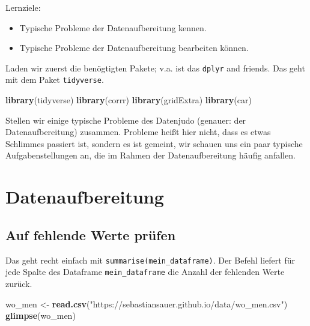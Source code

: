 \documentclass[12pt,ngerman,]{book}
\makeatletter
\newenvironment{Shaded}{\begin{snugshade}}{\end{snugshade}}
\newcommand{\KeywordTok}[1]{\textcolor[rgb]{0.13,0.29,0.53}{\textbf{{#1}}}}
\newcommand{\StringTok}[1]{\textcolor[rgb]{0.31,0.60,0.02}{{#1}}}
\newcommand{\NormalTok}[1]{{#1}}
\providecommand{\tightlist}{%
  \setlength{\itemsep}{0pt}\setlength{\parskip}{0pt}}
\newenvironment{kframe}{%
\medskip{}
\setlength{\fboxsep}{.8em}
 \def\at@end@of@kframe{}%
 \ifinner\ifhmode%
  \def\at@end@of@kframe{\end{minipage}}%
  \begin{minipage}{\columnwidth}%
 \fi\fi%
 \def\FrameCommand##1{\hskip\@totalleftmargin \hskip-\fboxsep
 \colorbox{shadecolor}{##1}\hskip-\fboxsep
     \hskip-\linewidth \hskip-\@totalleftmargin \hskip\columnwidth}%
 \MakeFramed {\advance\hsize-\width
   \@totalleftmargin\z@ \linewidth\hsize
   \@setminipage}}%
 {\par\unskip\endMakeFramed%
 \at@end@of@kframe}
\renewenvironment{Shaded}{\begin{kframe}}{\end{kframe}}
\let\BeginKnitrBlock\begin \let\EndKnitrBlock\end
\makeatother
\begin{document}
\BeginKnitrBlock{rmdcaution}
Lernziele:

\begin{itemize}
\tightlist
\item
  Typische Probleme der Datenaufbereitung kennen.
\item
  Typische Probleme der Datenaufbereitung bearbeiten können.
\end{itemize}
\EndKnitrBlock{rmdcaution}

Laden wir zuerst die benögtigten Pakete; v.a. ist das \texttt{dplyr} and
friends. Das geht mit dem Paket \texttt{tidyverse}.

\begin{Shaded}
\begin{Highlighting}[]
\KeywordTok{library}\NormalTok{(tidyverse)}
\KeywordTok{library}\NormalTok{(corrr)}
\KeywordTok{library}\NormalTok{(gridExtra)}
\KeywordTok{library}\NormalTok{(car)}
\end{Highlighting}
\end{Shaded}

Stellen wir einige typische Probleme des Datenjudo (genauer: der
Datenaufbereitung) zusammen. Probleme heißt hier nicht, dass es etwas
Schlimmes passiert ist, sondern es ist gemeint, wir schauen uns ein paar
typische Aufgabenstellungen an, die im Rahmen der Datenaufbereitung
häufig anfallen.

\section{Datenaufbereitung}\label{datenaufbereitung}

\subsection{Auf fehlende Werte prüfen}\label{auf-fehlende-werte-prufen}

Das geht recht einfach mit \texttt{summarise(mein\_dataframe)}. Der
Befehl liefert für jede Spalte des Dataframe \texttt{mein\_dataframe}
die Anzahl der fehlenden Werte zurück.

\begin{Shaded}
\begin{Highlighting}[]
\NormalTok{wo_men <-}\StringTok{ }\KeywordTok{read.csv}\NormalTok{(}\StringTok{"https://sebastiansauer.github.io/data/wo_men.csv"}\NormalTok{)}
\KeywordTok{glimpse}\NormalTok{(wo_men)}
\end{Highlighting}
\end{Shaded}
\end{document}
